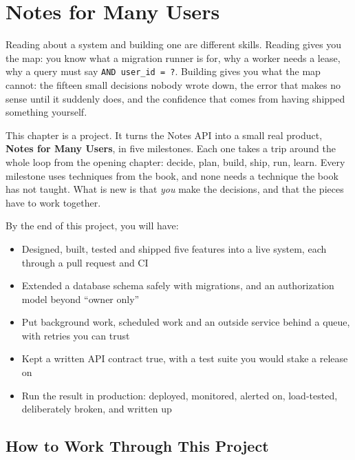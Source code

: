 \setcounter{chapter}{43}
\chapter{Notes for Many Users}\label{ch:44-project-notes-for-many-users}


\chapterrule

Reading about a system and building one are different skills. Reading gives you the map: you know what a migration runner is for, why a worker needs a lease, why a query must say \texttt{AND\ user\_id\ =\ ?}. Building gives you what the map cannot: the fifteen small decisions nobody wrote down, the error that makes no sense until it suddenly does, and the confidence that comes from having shipped something yourself.

This chapter is a project. It turns the Notes API into a small real product, \textbf{Notes for Many Users}, in five milestones. Each one takes a trip around the whole loop from the opening chapter: decide, plan, build, ship, run, learn. Every milestone uses techniques from the book, and none needs a technique the book has not taught. What is new is that \emph{you} make the decisions, and that the pieces have to work together.

By the end of this project, you will have:

\begin{itemize}
\tightlist
\item
  Designed, built, tested and shipped five features into a live system, each through a pull request and CI
\item
  Extended a database schema safely with migrations, and an authorization model beyond ``owner only''
\item
  Put background work, scheduled work and an outside service behind a queue, with retries you can trust
\item
  Kept a written API contract true, with a test suite you would stake a release on
\item
  Run the result in production: deployed, monitored, alerted on, load-tested, deliberately broken, and written up
\end{itemize}

\setcounter{section}{0}
\section{How to Work Through This Project}\label{44-project-notes-for-many-users:441-how-to-work-through-this-project}

